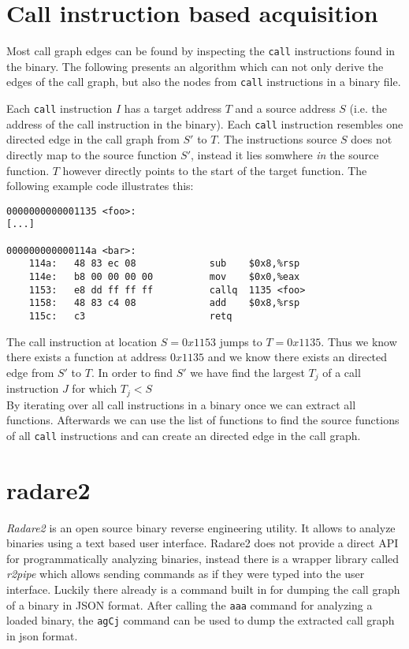 \documentclass[
    12pt,                               %
    DIV=14,                     %
    parskip=half+,              %
    bigheadings,                %
    cleardoubleempty,   %
    halfparskip,                %
    ]{scrreprt} %
\begin{document}
\section{Call instruction based acquisition} \label{sec:graphfromcall}
Most call graph edges can be found by inspecting the \verb'call' instructions found in the binary. The following presents an algorithm which can not only derive the edges of the call graph, but also the nodes from \verb'call' instructions in a binary file.

Each \verb'call' instruction $I$ has a target address $T$ and a source address $S$ (i.e. the address of the call instruction in the binary). Each \verb'call' instruction resembles one directed edge in the call graph from $S'$ to $T$. The instructions source $S$ does not directly map to the source function $S'$, instead it lies somwhere \textit{in} the source function. $T$ however directly points to the start of the target function. The following example code illustrates this:
\begin{minipage}{\linewidth}
\begin{lstlisting}
0000000000001135 <foo>:
[...] 

000000000000114a <bar>:
    114a:	48 83 ec 08          	sub    $0x8,%rsp
    114e:	b8 00 00 00 00       	mov    $0x0,%eax
    1153:	e8 dd ff ff ff       	callq  1135 <foo>
    1158:	48 83 c4 08          	add    $0x8,%rsp
    115c:	c3                   	retq
\end{lstlisting}
\end{minipage}

The call instruction at location $S = 0x1153$ jumps to $T = 0x1135$. Thus we know there exists a function at address $0x1135$ and we know there exists an directed edge from $S'$ to $T$. In order to find $S'$ we have find the largest $T_j$ of a call instruction $J$ for which $T_j < S$ \\
By iterating over all call instructions in a binary once we can extract all functions. Afterwards we can use the list of functions to find the source functions of all \verb'call' instructions and can create an directed edge in the call graph.

\section{radare2} \label{sec:radare2}
\textit{Radare2} is an open source binary reverse engineering utility. It allows to analyze binaries using a text based user interface. Radare2 does not provide a direct API for programmatically analyzing binaries, instead there is a wrapper library called \textit{r2pipe} which allows sending commands as if they were typed into the user interface. Luckily there already is a command built in for dumping the call graph of a binary in JSON format. After calling the \verb'aaa' command for analyzing a loaded binary, the \verb'agCj' command can be used to dump the extracted call graph in json format.
\end{document}
